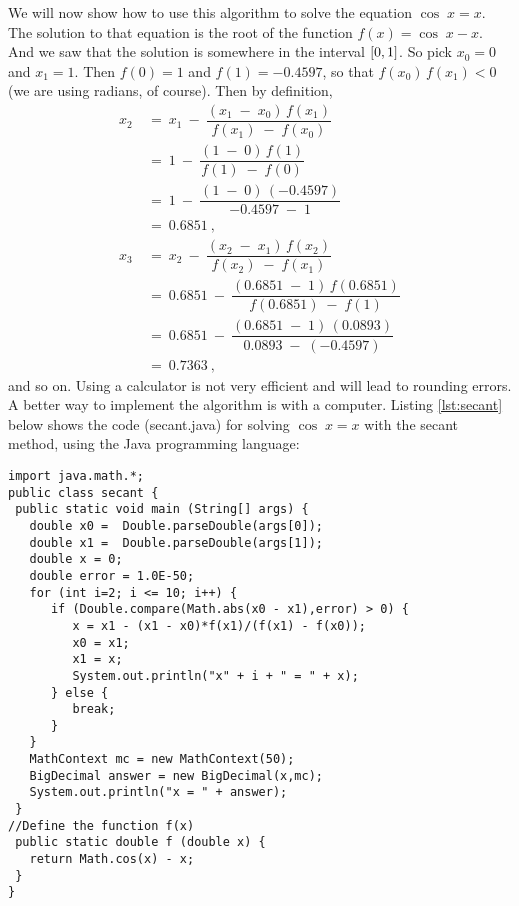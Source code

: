 We will now show how to use this algorithm to solve the equation $\cos\;x = x$. The solution to that
equation is the root of the function $f(x) =\cos\;x - x$. And we saw that the solution is somewhere
in the interval $\lbrack 0,1 \rbrack$. So pick $x_0 = 0$ and $x_1 = 1$. Then $f(0)=1$ and $f(1)=-0.4597$, so
that $f(x_0)\,f(x_1) < 0$ (we are using radians, of course). Then by definition,
\begin{align*}
 x_2 ~&=~ x_1 ~-~ \dfrac{(x_1 \;-\; x_0)\,f(x_1)}{f(x_1) \;-\; f(x_0)}\\
 &=~ 1 ~-~ \dfrac{(1 \;-\; 0)\,f(1)}{f(1) \;-\; f(0)}\\
 &=~ 1 ~-~ \dfrac{(1 \;-\; 0)\,(-0.4597)}{-0.4597 \;-\; 1}\\
 &=~ 0.6851~,\\
 x_3 ~&=~ x_2 ~-~ \dfrac{(x_2 \;-\; x_1)\,f(x_2)}{f(x_2) \;-\; f(x_1)}\\
 &=~ 0.6851 ~-~ \dfrac{(0.6851 \;-\; 1)\,f(0.6851)}{f(0.6851) \;-\; f(1)}\\
 &=~ 0.6851 ~-~ \dfrac{(0.6851 \;-\; 1)\,(0.0893)}{0.0893 \;-\; (-0.4597)}\\
 &=~ 0.7363 ~,
\end{align*}
and so on. Using a calculator is not very efficient and will lead to rounding errors. A better way
to implement the algorithm is with a computer. Listing \ref{lst:secant} below shows the code
(secant.java) for solving $\cos\;x = x$ with the secant method, using the Java programming language:

\begin{center}\begin{minipage}[t]{13cm}
\begin{lstlisting}[frame=single,framerule=0pt]
import java.math.*;
public class secant {
 public static void main (String[] args) {
   double x0 =  Double.parseDouble(args[0]);
   double x1 =  Double.parseDouble(args[1]);
   double x = 0;
   double error = 1.0E-50;
   for (int i=2; i <= 10; i++) {
      if (Double.compare(Math.abs(x0 - x1),error) > 0) {
         x = x1 - (x1 - x0)*f(x1)/(f(x1) - f(x0));
         x0 = x1;
         x1 = x;
         System.out.println("x" + i + " = " + x);
      } else {
         break;
      }
   }
   MathContext mc = new MathContext(50);
   BigDecimal answer = new BigDecimal(x,mc);
   System.out.println("x = " + answer);
 }
//Define the function f(x)
 public static double f (double x) {
   return Math.cos(x) - x;
 }
}
\end{lstlisting}
\end{minipage}\end{center}

